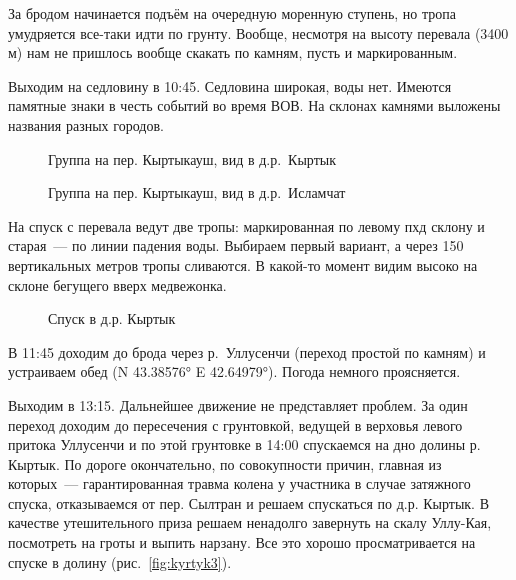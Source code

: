 За бродом начинается подъём на очередную моренную ступень, но тропа умудряется все-таки идти по грунту. Вообще, несмотря на высоту перевала (3400 м) нам не пришлось вообще скакать по камням, пусть и маркированным.

Выходим на седловину в 10:45. Седловина широкая, воды нет. Имеются памятные знаки в честь событий во время ВОВ. На склонах камнями выложены названия разных городов.

\begin{figure}[h!]
	\centering
	\caption{Группа на пер. Кыртыкауш, вид в д.р.~Кыртык}
	\label{fig:kyrtyk1}
\end{figure}

\begin{figure}[h!]
	\centering
	\caption{Группа на пер. Кыртыкауш, вид в д.р.~Исламчат}
	\label{fig:kyrtyk2}
\end{figure}

На спуск с перевала ведут две тропы: маркированная по левому пхд склону и старая~--- по линии падения воды. Выбираем первый вариант, а через 150 вертикальных метров тропы сливаются. В какой-то момент видим высоко на склоне бегущего вверх медвежонка.

\begin{figure}[h!]
	\centering
	\caption{Спуск в д.р. Кыртык}
	\label{fig:kyrtykfall}
\end{figure}

В 11:45 доходим до брода через р.~Уллусенчи (переход простой по камням) и устраиваем обед (N 43.38576° E 42.64979°). Погода немного проясняется.

Выходим в 13:15. Дальнейшее движение не представляет проблем. За один переход доходим до пересечения с грунтовкой, ведущей в верховья левого притока Уллусенчи и по этой грунтовке в 14:00 спускаемся на дно долины р. Кыртык. По дороге окончательно, по совокупности причин, главная из которых~--- гарантированная травма колена у участника в случае затяжного спуска, отказываемся от пер. Сылтран и решаем спускаться по д.р. Кыртык. В качестве утешительного приза решаем ненадолго завернуть на скалу Уллу-Кая, посмотреть на гроты и выпить нарзану. Все это хорошо просматривается на спуске в долину (рис.~\ref{fig:kyrtyk3}).


